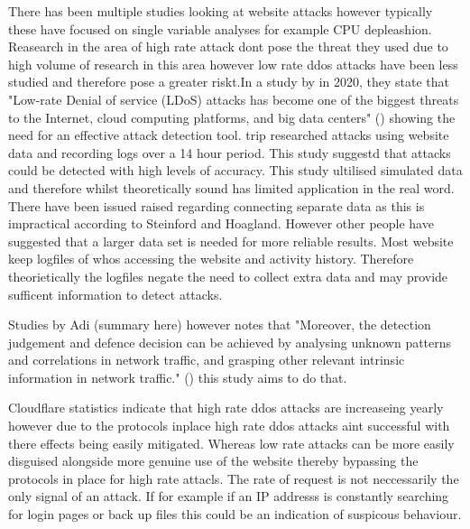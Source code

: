 
There has been multiple studies looking at website attacks however typically these have focused on single variable analyses for example CPU depleashion. Reasearch in the area of high rate attack dont pose the threat they used due to high volume of research in this area however low rate ddos attacks have been less studied and therefore pose a greater riskt.In a study by \citeauthor{9016229} in 2020, they state that "Low-rate Denial of service (LDoS) attacks has become one of the biggest threats to the Internet, cloud computing platforms, and big data centers" (\cite{9016229}) showing the need for an effective attack detection tool. trip researched attacks using website data and recording logs over a 14 hour period. This study suggestd that attacks could be detected with high levels of accuracy. This study ultilised simulated data and therefore whilst theoretically sound  has limited application in the real word. There have been issued raised regarding connecting separate data as this is impractical according to Steinford and Hoagland. However other people have suggested that a larger data set is needed for more reliable results. Most website keep logfiles of whos accessing the website and activity history. Therefore theorietically the logfiles negate the need to collect extra data and may provide sufficent information to detect attacks. 

 Studies by Adi (summary here) however \citeauthor{9016229} notes that "Moreover, the detection judgement and defence decision can be achieved by analysing unknown patterns and correlations in network traffic, and grasping other relevant intrinsic information in network traffic."  (\cite{9016229}) this study aims to do that.

Cloudflare statistics indicate that high rate ddos attacks are increaseing yearly however due to the protocols inplace high rate ddos attacks aint successful with there effects being easily mitigated. Whereas low rate attacks can be more easily disguised alongside more genuine use of the website thereby bypassing the protocols in place for high rate attacls. The rate of request is not neccessarily the only signal of an attack. If for example if an IP addresss is constantly searching for login pages or back up files this could be an indication of suspicous behaviour. 

